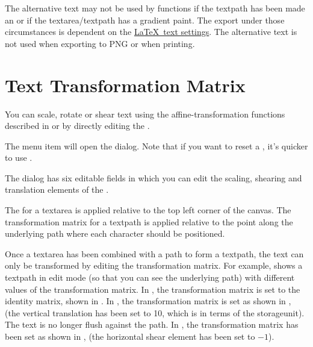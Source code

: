 \begin{important}
The alternative text may not be used by  functions if
the \gls*{textpath} has been made an  or if the
\gls*{textarea}\slash\gls*{textpath} has a gradient paint.
The export  under those circumstances is dependent on
the \hyperref[sec:texconfigtext]{\LaTeX\ text settings}.
The alternative text is not used when exporting to PNG or when
\gls{printing}.
\end{important}


\section{Text Transformation Matrix}\label{sec:textmatrix}

You can scale, rotate or shear text
using the \gls{affine-transformation} functions described in 
 or by directly editing the
.


The  menu item will open the 
dialog.
Note that if you want to reset a , 
it's quicker to use .


The  dialog has six editable fields in which
you can edit the scaling, shearing and translation elements of the
.

The  for a \gls*{textarea} is
applied relative to the top left corner of the \gls{canvas}. The
transformation matrix for a \gls{textpath} is applied relative to
the point along the underlying path where each character should be
positioned.

Once a \gls*{textarea} has been combined with a \gls{path} to form a
\gls{textpath}, the text can only be transformed by editing the
transformation matrix.  For example, 
shows a \gls*{textpath} in edit mode (so that you can see the
underlying path) with different values of the transformation matrix.
In , the transformation matrix is
set to the identity matrix, shown in
.  In
, the transformation matrix is set
as shown in , (the vertical
translation has been set to 10, which is in terms of the
\gls{storageunit}). The text is no longer flush against
the path. In , the transformation
matrix has been set as shown in ,
(the horizontal shear element has been set to $-1$).

